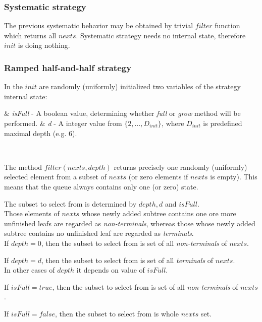 \documentclass[12pt,a4paper]{report}
\newcommand{\setDots}[2]{ 
	\lbrace #1 , \dots , #2 \rbrace
}
\newenvironment{enum}
{\begin{easylist}[itemize]}
{\end{easylist}}
\begin{document}
\subsubsection{Systematic strategy}

The previous systematic behavior may be obtained by trivial 
$filter$ function which returns all $nexts$.
Systematic strategy needs no internal state, 
therefore $init$ is doing nothing.

\subsubsection{Ramped half-and-half strategy}

In the $init$ are randomly (uniformly) initialized two variables of the
strategy internal state:

\begin{enum}
 & \textit{isFull} - A boolean value, determining whether \textit{full}
                     or \textit{grow} method will be performed.
 & \textit{d} - A integer value from $\setDots{2}{D_{init}}$, where 
                $D_{init}$ is predefined maximal depth (e.g. 6).                    
\end{enum}~


The method $filter(nexts,depth)$ returns precisely one randomly
(uniformly) selected  element from a subset of $nexts$
(or zero elements if $nexts$ is empty). 
This means that the queue always contains only one (or zero) state.

The subset to select from is determined by $depth, d$ and $isFull$.\\


Those elements of $nexts$ whose newly added subtree contains one ore more 
unfinished leafs are regarded as \textit{non-terminals}, whereas 
those whose newly added subtree contains no unfinished leaf are regarded as 
\textit{terminals}.\\


If $depth = 0$, then the subset to select from is  
set of all \textit{non-terminals} of $nexts$.

If $depth = d$, then the subset to select from is
set of all \textit{terminals} of $nexts$.\\


In other cases of $depth$ it depends on value of $isFull$.

If $isFull = true$, then the subset to select from is 
set of all \textit{non-terminals} of $nexts$.

If $isFull = false$, then the subset to select from is 
whole $nexts$ set.
\end{document}

